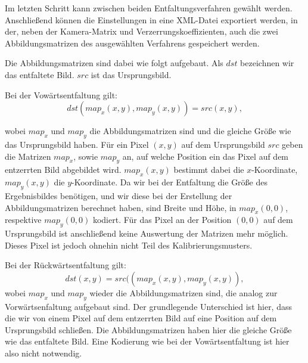 Im letzten Schritt kann zwischen beiden Entfaltungsverfahren gewählt werden. Anschließend können die Einstellungen in eine XML-Datei exportiert werden, in der, neben der Kamera-Matrix und Verzerrungskoeffizienten, auch die zwei Abbildungsmatrizen des ausgewählten Verfahrens gespeichert werden. 


Die Abbildungsmatrizen sind dabei wie folgt aufgebaut. Als $dst$ bezeichnen wir das entfaltete Bild. $src$ ist das Ursprungsbild.

Bei der Vowärtsentfaltung gilt:
\[
dst(map_x(x,y), map_y(x,y)) = src(x,y),
\]

wobei $map_x$ und $map_y$ die Abbildungsmatrizen sind und die gleiche Größe wie das Ursprungsbild haben. Für ein Pixel $(x,y)$ auf dem Ursprungsbild $src$ geben die Matrizen $map_x$, sowie $map_y$ an, auf welche Position ein das Pixel auf dem entzerrten Bild abgebildet wird. $map_x(x,y)$ bestimmt dabei die $x$-Koordinate, $map_y(x,y)$ die $y$-Koordinate. Da wir bei der Entfaltung die Größe des Ergebnisbildes benötigen, und wir diese bei der Erstellung der Abbildungsmatrizen berechnet haben, sind Breite und Höhe, in $map_x(0,0)$, respektive $map_y(0,0)$ kodiert. Für das Pixel an der Position $(0,0)$ auf dem Ursprungsbild ist anschließend keine Auswertung der Matrizen mehr möglich. Dieses Pixel ist jedoch ohnehin nicht Teil des Kalibrierungsmusters.

Bei der Rückwärtsentfaltung gilt:
\[
dst(x,y) = src((map_x(x,y),map_y(x,y)),
\]
wobei $map_x$ und $map_y$ wieder die Abbildungsmatrizen sind, die analog zur Vorwärtsenfaltung aufgebaut sind. Der grundlegende Unterschied ist hier, dass die wir von einem Pixel auf dem entzerrten Bild auf eine Position auf dem Ursprungsbild schließen. Die Abbildungsmatrizen haben hier die  gleiche Größe wie das entfaltete Bild. Eine Kodierung wie bei der Vowärtsentfaltung ist hier also nicht notwendig.
